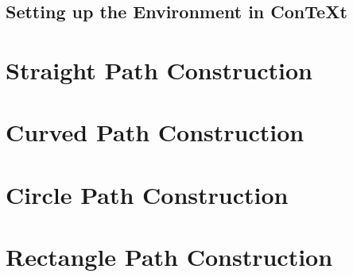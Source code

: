\documentclass{memoir}
\begin{document}
\subsection[Con\TeX t]{Setting up the Environment in Con\TeX t}
\lipsum
\section[Straight Paths]{Straight Path Construction}
\lipsum
\section[Curved Paths]{Curved Path Construction}
\lipsum
\section[Circle Paths]{Circle Path Construction}
\lipsum
\section[Rectangle Paths]{Rectangle Path Construction}
\lipsum
\end{document}

